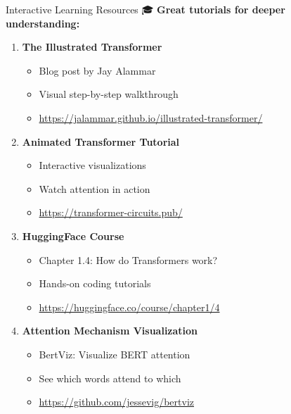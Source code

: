 \documentclass[aspectratio=169]{beamer}
\begin{document}
\begin{frame}[shrink=10]{Interactive Learning Resources 🎓}
\textbf{Great tutorials for deeper understanding:}

\vspace{1em}

\begin{enumerate}\setlength{\itemsep}{0pt}
    \item \textbf{The Illustrated Transformer}
    \begin{itemize}\setlength{\itemsep}{0pt}
        \item Blog post by Jay Alammar
        \item Visual step-by-step walkthrough
        \item \url{https://jalammar.github.io/illustrated-transformer/}
    \end{itemize}

    \vspace{0.5em}

    \item \textbf{Animated Transformer Tutorial}
    \begin{itemize}\setlength{\itemsep}{0pt}
        \item Interactive visualizations
        \item Watch attention in action
        \item \url{https://transformer-circuits.pub/}
    \end{itemize}

    \vspace{0.5em}

    \item \textbf{HuggingFace Course}
    \begin{itemize}\setlength{\itemsep}{0pt}
        \item Chapter 1.4: How do Transformers work?
        \item Hands-on coding tutorials
        \item \url{https://huggingface.co/course/chapter1/4}
    \end{itemize}

    \vspace{0.5em}

    \item \textbf{Attention Mechanism Visualization}
    \begin{itemize}\setlength{\itemsep}{0pt}
        \item BertViz: Visualize BERT attention
        \item See which words attend to which
        \item \url{https://github.com/jessevig/bertviz}
    \end{itemize}
\end{enumerate}
\end{frame}
\end{document}
